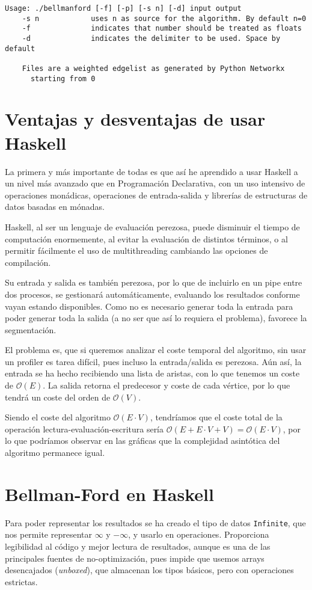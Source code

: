\documentclass{article}
\begin{document}
\begin{verbatim}
Usage: ./bellmanford [-f] [-p] [-s n] [-d] input output
    -s n            uses n as source for the algorithm. By default n=0
    -f              indicates that number should be treated as floats
    -d              indicates the delimiter to be used. Space by default

    Files are a weighted edgelist as generated by Python Networkx
      starting from 0
\end{verbatim}

\section{Ventajas y desventajas de usar Haskell}
La primera y más importante de todas es que así he aprendido a usar Haskell a un nivel más avanzado que en Programación Declarativa, con un uso intensivo de operaciones monádicas, operaciones de entrada-salida y librerías de estructuras de datos basadas en mónadas.

Haskell, al ser un lenguaje de evaluación perezosa, puede disminuir el tiempo de computación enormemente, al evitar la evaluación de distintos términos, o al permitir fácilmente el uso de multithreading cambiando las opciones de compilación.

Su entrada y salida es también perezosa, por lo que de incluirlo en un pipe entre dos procesos, se gestionará automáticamente, evaluando los resultados conforme vayan estando disponibles. Como no es necesario generar toda la entrada para poder generar toda la salida (a no ser que así lo requiera el problema), favorece la segmentación.

El problema es, que si queremos analizar el coste temporal del algoritmo, sin usar un profiler es tarea difícil, pues incluso la entrada/salida es perezosa. Aún así, la entrada se ha hecho recibiendo una lista de aristas, con lo que tenemos un coste de $\mathcal{O}\left(E\right)$. La salida retorna el predecesor y coste de cada vértice, por lo que tendrá un coste del orden de $\mathcal{O}\left(V\right)$.

Siendo el coste del algoritmo $\mathcal{O}\left(E\cdot V\right)$, tendríamos que el coste total de la operación lectura-evaluación-escritura sería $\mathcal{O}\left(E + E\cdot V + V\right)=\mathcal{O}\left(E\cdot V\right)$, por lo que podríamos observar en las gráficas que la complejidad asintótica del algoritmo permanece igual.

\section{Bellman-Ford en Haskell}
Para poder representar los resultados se ha creado el tipo de datos \texttt{Infinite}, que nos permite representar $\infty$ y $-\infty$, y usarlo en operaciones. Proporciona legibilidad al código y mejor lectura de resultados, aunque es una de las principales fuentes de no-optimización, pues impide que usemos arrays desencajados (\textit{unboxed}), que almacenan los tipos básicos, pero con operaciones estrictas.
\end{document}
